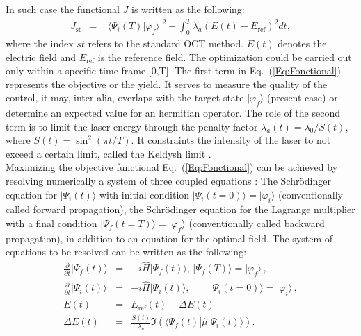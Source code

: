 \documentclass[]{interact}
\theoremstyle{plain}%
\theoremstyle{definition}
\theoremstyle{remark}
\begin{document}
In such case the functional $J$ is written as the following: 
\begin{eqnarray} 
  J_{\mathrm{st}} & = & |\langle\varPsi_i(T)|\varphi_f\rangle|^2 -\int_0^T 
\lambda_a 
{(E(t)-E_\mathrm{ref})^2 dt}, 
\label{Eq:Fonctional}
\end{eqnarray}
where the index $st$ refers to the standard OCT method. $E(t)$ 
denotes the electric field and $E_\mathrm{ref}$ is the reference field.  
The optimization could be carried out only within a specific time frame [0,T]. 
The 
first term in Eq.~(\ref{Eq:Fonctional}) represents the objective or the yield. 
It serves to measure the quality of the control, it may, inter alia, 
overlaps with the target state $|\varphi_f\rangle$ (present case) or determine 
an expected 
value for an hermitian operator. The role of the second term is to limit the 
laser energy through the penalty factor $\lambda_a(t)=\lambda_0/S(t)$, where 
$S(t)=\sin^2(\pi t/T)$. It constraints the intensity of the laser to not exceed 
a certain limit, called the Keldysh limit \cite{Keldysh}. 
\\
Maximizing the objective functional Eq.~(\ref{Eq:Fonctional}) can be achieved 
by  
resolving numerically a system of three coupled equations \cite{Rabitz1}: 
The Schr\"{o}dinger equation for $|\varPsi_i(t)\rangle$ with initial condition 
$|\varPsi_i(t=0)\rangle=|\varphi_i\rangle$ (conventionally called forward 
propagation), the Schr\"{o}dinger equation for the Lagrange multiplier with a 
final condition $|\varPsi_f(t=T)\rangle=|\varphi_f\rangle$ (conventionally 
called backward propagation), in addition to an equation for the optimal field. 
The system of equations to be resolved can be written as the following:  
 \begin{subequations}
 \begin{eqnarray}
   \frac{\partial}{\partial t} |\varPsi_f(t)\rangle 
   &=& -i \hat{H}|\varPsi_f(t)\rangle,  
    \, |\varPsi_f(T)\rangle =  |\varphi_f\rangle
   \,, 
   \label{eq:system1}
   \\
    \frac{\partial}{\partial t} |\varPsi_i(t)\rangle &=& -i
   \hat{H} |\varPsi_i(t)\rangle,  
    \qquad |\varPsi_i(t = 0)\rangle = |\varphi_i\rangle\,, 
   \label{eq:system2}
    \\
    E(t) &=& E_{\mathrm{ref}}(t) + \Delta E(t)
   \label{eq:system3}
    \\
    \Delta E(t) &= & \frac{S(t)}{\lambda_a} \Im \left(\langle \varPsi_f(t)| 
  \hat{\mu} |\varPsi_i(t)\rangle \right). \nonumber
 \end{eqnarray}
   \label{eq:system}
 \end{subequations}
\end{document}
